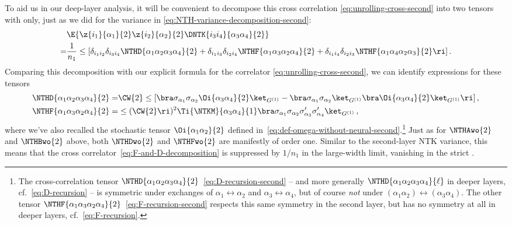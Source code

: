To aid us in our deep-layer analysis, it will be convenient to 
 decompose this cross correlation \eqref{eq:unrolling-cross-second} into two tensors with  only, just as we did for the variance in \eqref{eq:NTH-variance-decomposition-second}:
\begin{align}\label{eq:F-and-D-decomposition}\index{tensor decomposition!NTK-preactivation $D$/$F$}
&\E{\z{i_1}{\alpha_1}{2}\z{i_2}{\alpha_2}{2}\DNTK{i_3i_4}{\alpha_3\alpha_4}{2}} \\
=&\frac{1}{n_1}\le[\delta_{i_1i_2}\delta_{i_3i_4} \NTHD{\alpha_1\alpha_2\alpha_3\alpha_4}{2}+\delta_{i_1i_3}\delta_{i_2i_4}\NTHF{\alpha_1\alpha_3\alpha_2\alpha_4}{2}+\delta_{i_1i_4}\delta_{i_2i_3}\NTHF{\alpha_1\alpha_4\alpha_2\alpha_3}{2}\ri]\, \notag .
\end{align}
Comparing this decomposition with our explicit formula for the correlator \eqref{eq:unrolling-cross-second}, we can identify expressions for these tensors
\begin{align}
\NTHD{\alpha_1\alpha_2\alpha_3\alpha_4}{2}=&\CW{2}\le[ \bra \sigma_{\alpha_1}\sigma_{\alpha_2} \Oi{\alpha_3\alpha_4}{2} \ket_{G^{(1)}}-\bra\sigma_{\alpha_1}\sigma_{\alpha_2}\ket_{G^{(1)}}\bra \Oi{\alpha_3\alpha_4}{2} \ket_{G^{(1)}}\ri]\, ,\label{eq:D-recursion-second}\\
\NTHF{\alpha_1\alpha_3\alpha_2\alpha_4}{2}=&\le(\CW{2}\ri)^2\Ti{\NTKM}{\alpha_3\alpha_4}{1}\bra\sigma_{\alpha_1}\sigma_{\alpha_2}\sigma^{\prime}_{\alpha_3}\sigma^{\prime}_{\alpha_4}\ket_{G^{(1)}}\, ,\label{eq:F-recursion-second}
\end{align}
where we've also recalled the stochastic tensor $\Oi{\alpha_1\alpha_2}{2}$ defined in~\eqref{eq:def-omega-without-neural-second}.\footnote{The cross-correlation tensor $\NTHD{\alpha_1\alpha_2\alpha_3\alpha_4}{2}$~\eqref{eq:D-recursion-second} -- and more generally $\NTHD{\alpha_1\alpha_2\alpha_3\alpha_4}{\ell}$ in deeper layers, cf.~\eqref{eq:D-recursion} -- is symmetric under exchanges of  $\alpha_1\leftrightarrow \alpha_2$ and $\alpha_3\leftrightarrow \alpha_4$, but of course \emph{not} under $(\alpha_1\alpha_2) \leftrightarrow (\alpha_3\alpha_4)$.
The other tensor $\NTHF{\alpha_1\alpha_3\alpha_2\alpha_4}{2}$~\eqref{eq:F-recursion-second} respects this same symmetry in the second layer, but has no symmetry at all in deeper layers, cf.~\eqref{eq:F-recursion}.}
Just as for $\NTHAwo{2}$ and  $\NTHBwo{2}$ above, both $\NTHDwo{2}$ and $\NTHFwo{2}$ are manifestly of order one. Similar to the second-layer NTK variance, this means that the cross correlator~\eqref{eq:F-and-D-decomposition} is suppressed by $1/n_1$ in the large-width limit, vanishing in the strict .






